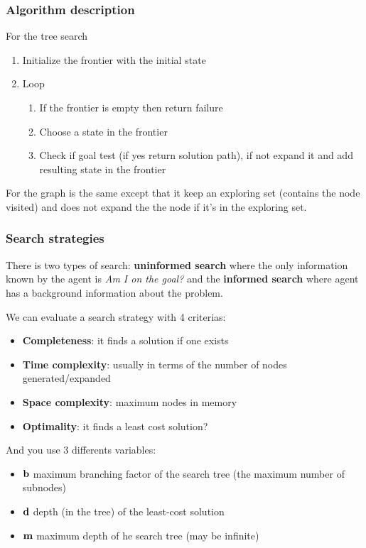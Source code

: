 \subsubsection{Algorithm description}
For the tree search
	\begin{enumerate}
	\item Initialize the frontier with the initial state
	\item Loop
		\begin{enumerate}
			\item If the frontier is empty then return failure
			\item Choose a state in the frontier
			\item Check if goal test (if yes return solution path), if not expand it and add resulting state in the
			frontier
		\end{enumerate}
\end{enumerate}
For the graph is the same except that it keep an exploring set (contains the node visited) and does not 
expand the the node if it's in the exploring set.
\subsubsection{Search strategies}

There is two types of  search: \textbf{uninformed search} where the only
information known  by the agent  is \textit{Am I  on the goal?}  and the
\textbf{informed search} where agent  has a background information about
the problem.

We can evaluate a search strategy with 4 criterias:
\begin{itemize}
    \item \textbf{Completeness}: it finds a solution if one exists
    \item \textbf{Time complexity}: usually in terms of the number of nodes generated/expanded
    \item \textbf{Space complexity}: maximum nodes in memory
    \item \textbf{Optimality}: it finds a least cost solution?
\end{itemize}
And you use 3 differents variables:
\begin{itemize}
    \item $\textbf b$  maximum branching factor of the search tree (the maximum number of subnodes)
    \item $\textbf d$  depth (in the tree) of the least-cost solution
    \item $\textbf m$  maximum depth of he search tree (may be infinite)
\end{itemize}



